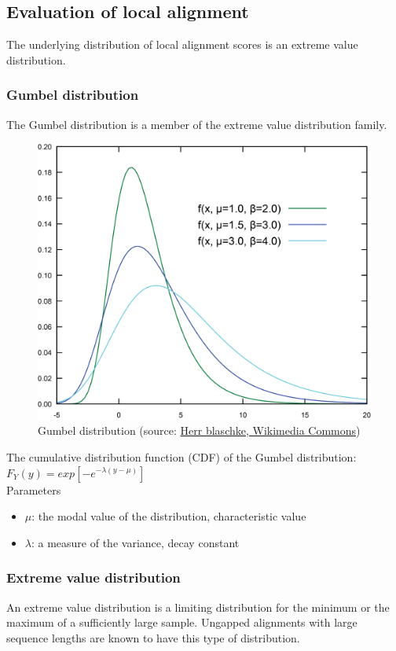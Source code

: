 %
%

%
%
\subsection{Evaluation of local alignment}
The underlying distribution of local alignment scores is an extreme value distribution.

%
%
\subsubsection*{Gumbel distribution} 
The Gumbel distribution is a member of the extreme value distribution family. \\

\begin{figure}[H]
  \centering
      \includegraphics[width=0.4 \textwidth]{fig06/gumbel.png}
  \caption{Gumbel distribution (source: \href{https://commons.wikimedia.org/w/index.php?curid=4787663}{Herr blaschke, Wikimedia Commons})}
\end{figure}

\noindent
The cumulative distribution function (CDF) of the Gumbel distribution: \\
$F_Y(y) = exp⁡[-e^{-\lambda(y-\mu)}]$ \\

\noindent
Parameters
\begin{itemize}
\item $\mu$: the modal value of the distribution, characteristic value
\item $\lambda$: a measure of the variance, decay constant
\end{itemize}

%
%
\subsubsection*{Extreme value distribution}
An extreme value distribution is a limiting distribution for the minimum or the maximum of a sufficiently large sample. Ungapped alignments with large sequence lengths are known to have this type of distribution. \\

